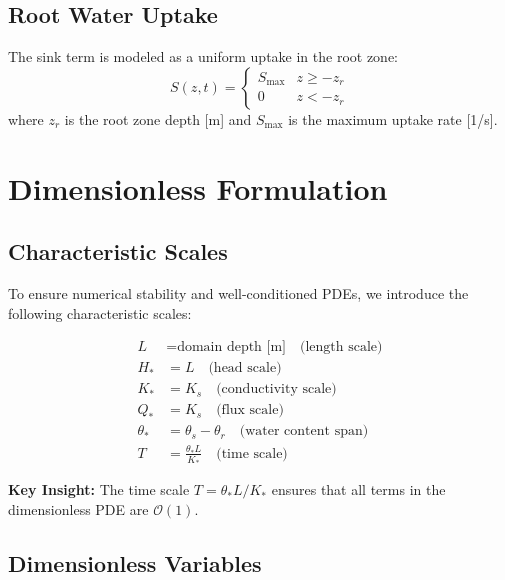\documentclass[11pt,a4paper]{article}
\begin{document}
\subsection{Root Water Uptake}
The sink term is modeled as a uniform uptake in the root zone:
\begin{equation}
    S(z,t) = \begin{cases}
        S_{\max} & z \geq -z_r \\
        0 & z < -z_r
    \end{cases}
    \label{eq:root_uptake}
\end{equation}
where $z_r$ is the root zone depth [m] and $S_{\max}$ is the maximum uptake rate [1/s].

\section{Dimensionless Formulation}

\subsection{Characteristic Scales}

To ensure numerical stability and well-conditioned PDEs, we introduce the following characteristic scales:

\begin{align}
    L &= \text{domain depth [m]} \quad \text{(length scale)} \\
    H_* &= L \quad \text{(head scale)} \\
    K_* &= K_s \quad \text{(conductivity scale)} \\
    Q_* &= K_s \quad \text{(flux scale)} \\
    \theta_* &= \theta_s - \theta_r \quad \text{(water content span)} \\
    T &= \frac{\theta_* L}{K_*} \quad \text{(time scale)}
\end{align}

\textbf{Key Insight:} The time scale $T = \theta_* L / K_*$ ensures that all terms in the dimensionless PDE are $\mathcal{O}(1)$.

\subsection{Dimensionless Variables}
\end{document}
